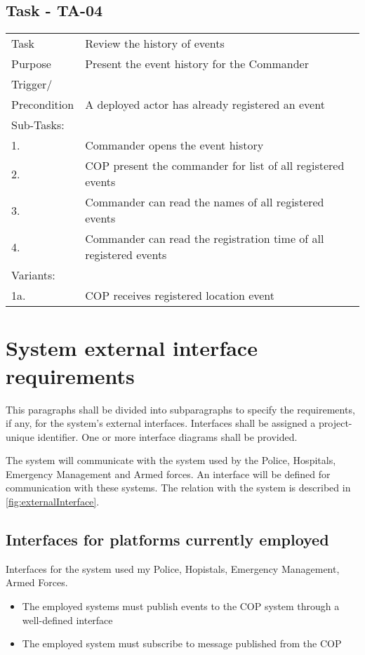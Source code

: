 \FloatBarrier
\newpage


\subsection{Task - TA-04}

\begin{longtable}{| p{2.5cm}  | p{10cm} |  }
	\hline
	Task & Review the history of events \\
	Purpose & Present the event history for the Commander \\
	Trigger/ &  \\ Precondition & A deployed actor has already registered an event \\
	\hline
	Sub-Tasks: & \\
	1. & Commander opens the event history \\
	2. & COP present the commander for list of all registered events  \\
	3. & Commander can read the names of all registered events \\
	4. & Commander can read the registration time of all registered events \\
	\hline
	Variants: & \\
	1a. & COP receives registered location event \\
	\hline
\end{longtable}

\section{System external interface requirements}
This paragraphs shall be divided into subparagraphs to specify the requirements, if any, for the system’s external interfaces. Interfaces shall be assigned a project-unique identifier. One or more interface diagrams shall be provided.

The system will communicate with the system used by the Police, Hospitals, Emergency Management and Armed forces. An interface will be defined for communication with these systems. The relation with the system is described in \ref{fig:externalInterface}.


\subsection{Interfaces for platforms currently employed}
Interfaces for the system used my Police, Hopistals, Emergency Management, Armed Forces.
\begin{itemize}
	\item The employed systems must publish events to the COP system through a well-defined interface
	\item The employed system must  subscribe to message published from the COP
\end{itemize}

